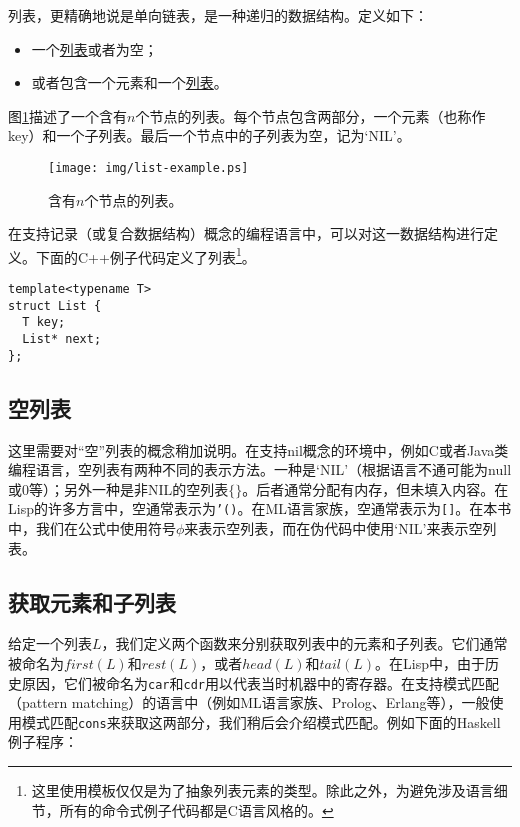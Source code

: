 \documentclass[UTF8]{article}
\begin{document}
列表，更精确地说是单向链表，是一种递归的数据结构。定义如下：

\begin{itemize}
\item 一个\underline{列表}或者为空；
\item 或者包含一个元素和一个\underline{列表}。
\end{itemize}

图\ref{fig:list-example}描述了一个含有$n$个节点的列表。每个节点包含两部分，一个元素（也称作key）和一个子列表。最后一个节点中的子列表为空，记为‘NIL’。

\begin{figure}[htbp]
  \centering
  \texttt{[image: img/list-example.ps]}
  \caption{含有$n$个节点的列表。} \label{fig:list-example}
\end{figure}

在支持记录（或复合数据结构）概念的编程语言中，可以对这一数据结构进行定义。下面的C++例子代码定义了列表\footnote{这里使用模板仅仅是为了抽象列表元素的类型。除此之外，为避免涉及语言细节，所有的命令式例子代码都是C语言风格的。}。

\lstset{language=C++}
\begin{lstlisting}
template<typename T>
struct List {
  T key;
  List* next;
};
\end{lstlisting}

\subsection{空列表}

这里需要对“空”列表的概念稍加说明。在支持nil概念的环境中，例如C或者Java类编程语言，空列表有两种不同的表示方法。一种是‘NIL’（根据语言不通可能为null或0等）；另外一种是非NIL的空列表$\{ \}$。后者通常分配有内存，但未填入内容。在Lisp的许多方言中，空通常表示为\texttt{'()}。在ML语言家族，空通常表示为\texttt{[]}。在本书中，我们在公式中使用符号$\phi$来表示空列表，而在伪代码中使用‘NIL’来表示空列表。

\subsection{获取元素和子列表}

给定一个列表$L$，我们定义两个函数来分别获取列表中的元素和子列表。它们通常被命名为$first(L)$和$rest(L)$，或者$head(L)$和$tail(L)$。在Lisp中，由于历史原因，它们被命名为\texttt{car}和\texttt{cdr}用以代表当时机器中的寄存器\cite{SICP}。在支持模式匹配（pattern matching）的语言中（例如ML语言家族、Prolog、Erlang等），一般使用模式匹配\texttt{cons}来获取这两部分，我们稍后会介绍模式匹配。例如下面的Haskell例子程序：
\end{document}
